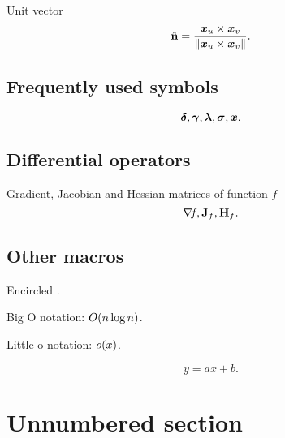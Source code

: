 Unit vector
\begin{equation}
	\hat{\mathbf{n}} = \frac{ {\boldsymbol{x}_u} \times {\boldsymbol{x}_v} }{\left\| { {\boldsymbol{x}_u} \times {\boldsymbol{x}_v} } \right\|}.
\end{equation}

\subsection{Frequently used symbols}
\begin{equation}
	\boldsymbol{\delta}, \boldsymbol{\gamma}, \boldsymbol{\lambda}, \boldsymbol{\sigma}, \boldsymbol{x}.
\end{equation}

\subsection{Differential operators}
Gradient, Jacobian and Hessian matrices of function $f$
\begin{equation}
	\nabla \! {f}, \mathbf{J}_{f}, \mathbf{H}_{f}.
\end{equation}

\subsection{Other macros}
Encircled .\par
Big O notation:  $O\!\left( {n \log{}n} \right)$. \par
Little o notation:  $o\!\left( {x} \right)$. \par

\lipsum
\begin{equation}
	y = ax + b.
\end{equation}

\section*{Unnumbered section}

\lipsum[1-12]
